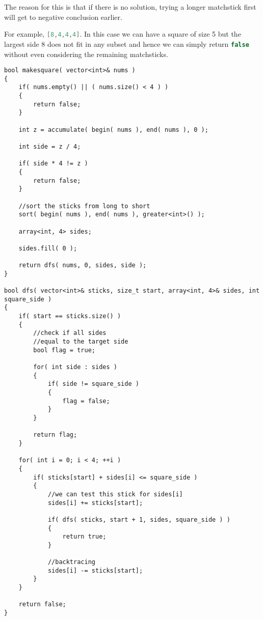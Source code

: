 The reason for this is that if there is no solution, trying a longer matchstick first will get to negative conclusion earlier.

For example, \lstinline[language=C++, basicstyle=\small\ttfamily, keywordstyle=\bfseries\color{green!40!black}]|[8,4,4,4]|. In this case we can have a square of size 5 but the largest side 8 does not fit in any subset and hence we can simply return \lstinline[language=C++, basicstyle=\small\ttfamily, keywordstyle=\bfseries\color{green!40!black}]|false| without even considering the remaining matchsticks.

\setcounter{lstlisting}{0}
\begin{lstlisting}[style=customc, caption={Brute Force DFS}]
bool makesquare( vector<int>& nums )
{
    if( nums.empty() || ( nums.size() < 4 ) )
    {
        return false;
    }

    int z = accumulate( begin( nums ), end( nums ), 0 );

    int side = z / 4;

    if( side * 4 != z )
    {
        return false;
    }

    //sort the sticks from long to short
    sort( begin( nums ), end( nums ), greater<int>() );

    array<int, 4> sides;

    sides.fill( 0 );

    return dfs( nums, 0, sides, side );
}

bool dfs( vector<int>& sticks, size_t start, array<int, 4>& sides, int square_side )
{
    if( start == sticks.size() )
    {
        //check if all sides
        //equal to the target side
        bool flag = true;

        for( int side : sides )
        {
            if( side != square_side )
            {
                flag = false;
            }
        }

        return flag;
    }

    for( int i = 0; i < 4; ++i )
    {
        if( sticks[start] + sides[i] <= square_side )
        {
            //we can test this stick for sides[i]
            sides[i] += sticks[start];

            if( dfs( sticks, start + 1, sides, square_side ) )
            {
                return true;
            }

            //backtracing
            sides[i] -= sticks[start];
        }
    }

    return false;
}
\end{lstlisting}

